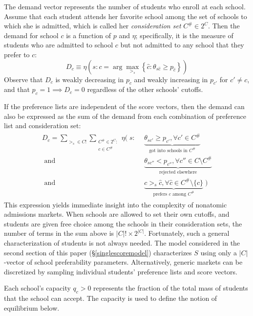 \documentclass[12pt]{article}
\theoremstyle{definition}
\begin{document}
The demand vector represents the number of students who enroll at each school. Assume that each student attends her favorite school among the set of schools to which she is admitted, which is called her \emph{consideration set} $C^\# \in 2^C$. Then the demand for school $c$ is a function of $p$ and $\eta$; specifically, it is the measure of students who are admitted to school $c$ but not admitted to any school that they prefer to $c$:
\begin{equation} \label{demanddefinition}
D_c \equiv \eta\left(s: c = \arg \max_{>_s} \left\{\hat c: \theta_{s\hat c} \geq p_{\hat c} \right\}\right)
\end{equation}
Observe that $D_c$ is weakly decreasing in $p_c$ and weakly increasing in $p_{c'}$ for $c' \neq c$, and that $p_c = 1 \implies D_c = 0$ regardless of the other schools' cutoffs.

If the preference lists are independent of the score vectors, then the demand can also be expressed as the sum of the demand from each combination of preference list and consideration set:
\begin{gather} \label{demandbigsum}
\begin{aligned}
D_c = 
\sum_{>_s \in C!} \sum_{\substack{C^\# \in 2^{C}:\\ c \in C^\#}}
\eta\Big(\;s:&~~\underbrace{\theta_{sc'} \geq p_{c'}, \forall c' \in C^\#}_{\text{got into schools in } C^\# } \\
\text{ and} &~~\underbrace{\theta_{sc''} < p_{c''}, \forall c'' \in C \setminus C^\#}_{\text{rejected elsewhere}} \\
\text{ and} &~~\underbrace{c >_s \hat c, \forall \hat c \in C^\#\setminus \{c\}}_{\text{prefers } c \text{ among } C^\#} \;\Big)
\end{aligned}
\end{gather}
This expression yields immediate insight into the complexity of nonatomic admissions markets. When schools are allowed to set their own cutoffs, and students are given free choice among the schools in their consideration sets, the number of terms in the sum above is $|C|!\times2^{|C|}$. Fortunately, such a general characterization of students is not always needed. The model considered in the second section of this paper (\S\ref{singlescoremodel}) characterizes $S$ using only a $|C|$-vector of school preferability parameters. Alternatively, generic markets can be discretized by sampling individual students' preference lists and score vectors. 

Each school's capacity $q_c > 0$ represents the fraction of the total mass of students that the school can accept. The capacity is used to define the notion of equilibrium below. 
\end{document}
